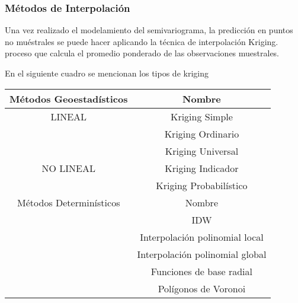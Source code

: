 \subsubsection{Métodos de Interpolación}

Una vez realizado el modelamiento del semivariograma, la predicción en puntos no muéstrales se puede hacer aplicando la técnica de interpolación Kriging. proceso que calcula el promedio ponderado de las observaciones muestrales.

 En el siguiente cuadro se mencionan los tipos de kriging

\begin{tabular}{cc}
\hline
Métodos Geoestadísticos& Nombre  \\ \hline
LINEAL & Kriging Simple \\
&Kriging Ordinario \\
& Kriging Universal \\ \hline
NO LINEAL & Kriging Indicador  \\
&Kriging Probabilístico  \\
\hline
Métodos Determinísticos& Nombre\\\hline
&IDW\\
&Interpolación polinomial local \\
&Interpolación polinomial global\\
&Funciones de base radial \\
&Polígonos de Voronoi \\
\hline


\end{tabular}





